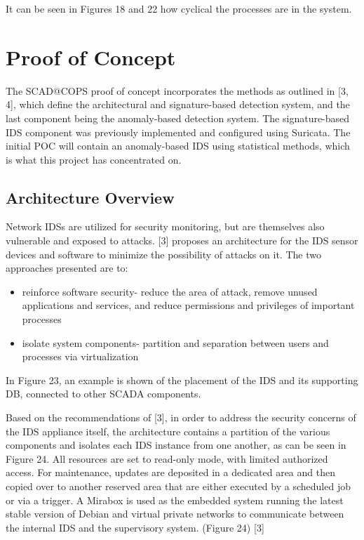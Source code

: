 \documentclass[11pt,]{article}
\begin{document}
It can be seen in Figures 18 and 22 how cyclical the processes are in
the system.

\clearpage

\section{Proof of Concept}\label{proof-of-concept}

The SCAD@COPS proof of concept incorporates the methods as outlined in
{[}3, 4{]}, which define the architectural and signature-based detection
system, and the last component being the anomaly-based detection system.
The signature-based IDS component was previously implemented and
configured using Suricata. The initial POC will contain an anomaly-based
IDS using statistical methods, which is what this project has
concentrated on.

\subsection{Architecture Overview}\label{architecture-overview}

Network IDSs are utilized for security monitoring, but are themselves
also vulnerable and exposed to attacks. {[}3{]} proposes an architecture
for the IDS sensor devices and software to minimize the possibility of
attacks on it. The two approaches presented are to:

\begin{itemize}
\itemsep1pt\parskip0pt
\item
  reinforce software security- reduce the area of attack, remove unused
  applications and services, and reduce permissions and privileges of
  important processes
\item
  isolate system components- partition and separation between users and
  processes via virtualization
\end{itemize}

In Figure 23, an example is shown of the placement of the IDS and its
supporting DB, connected to other SCADA components.

Based on the recommendations of {[}3{]}, in order to address the
security concerns of the IDS appliance itself, the architecture contains
a partition of the various components and isolates each IDS instance
from one another, as can be seen in Figure 24. All resources are set to
read-only mode, with limited authorized access. For maintenance, updates
are deposited in a dedicated area and then copied over to another
reserved area that are either executed by a scheduled job or via a
trigger. A Mirabox is used as the embedded system running the latest
stable version of Debian and virtual private networks to communicate
between the internal IDS and the supervisory system. (Figure 24) {[}3{]}
\end{document}
